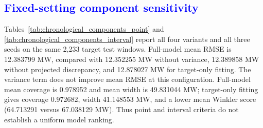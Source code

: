 \subsection{\textcolor{blue}{Fixed-setting component sensitivity}}
{\color{blue}Tables~\ref{tab:chronological_components_point} and \ref{tab:chronological_components_interval} report all four variants and all three seeds on the same 2,233 target test windows. Full-model mean RMSE is 12.383799 MW, compared with 12.352255 MW without variance, 12.389858 MW without projected discrepancy, and 12.878027 MW for target-only fitting. The variance term does not improve mean RMSE at this configuration. Full-model mean coverage is 0.978952 and mean width is 49.831044 MW; target-only fitting gives coverage 0.972682, width 41.148553 MW, and a lower mean Winkler score (64.713291 versus 67.038129 MW). Thus point and interval criteria do not establish a uniform model ranking.}

\begin{table}[pos=htbp]
\centering
\color{blue}
\small
\caption{\textcolor{blue}{Component evaluation at common settings: seed mean [minimum, maximum].}}
\label{tab:chronological_components_point}
\end{table}

